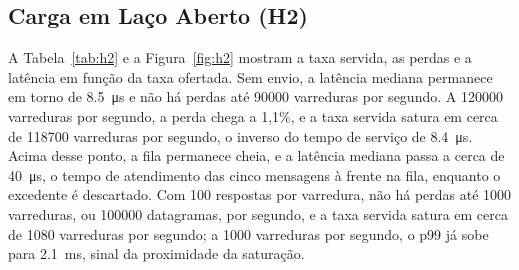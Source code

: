 \documentclass[
    12pt,
    oneside,
    a4paper,
    chapter=TITLE,
    section=TITLE,
    english,
    brazil
]{abntex2}
\begin{document}
\subsection{Carga em Laço Aberto (H2)}
A Tabela~\ref{tab:h2} e a Figura~\ref{fig:h2} mostram a taxa servida, as
perdas e a latência em função da taxa ofertada. Sem envio, a latência
mediana permanece em torno de \SI{8.5}{\micro\second} e não há perdas até
\num{90000} varreduras por segundo. A \num{120000} varreduras por segundo,
a perda chega a 1,1\%, e a taxa servida satura em cerca de \num{118700}
varreduras por segundo, o inverso do tempo de serviço de
\SI{8.4}{\micro\second}. Acima desse ponto, a fila permanece cheia, e a
latência mediana passa a cerca de \SI{40}{\micro\second}, o tempo de
atendimento das cinco mensagens à frente na fila, enquanto o excedente é
descartado. Com 100 respostas por varredura, não há perdas até
\num{1000} varreduras, ou \num{100000} datagramas, por segundo, e a taxa
servida satura em cerca de \num{1080} varreduras por segundo; a
\num{1000} varreduras por segundo, o p99 já sobe para
\SI{2.1}{\milli\second}, sinal da proximidade da saturação.
\end{document}
